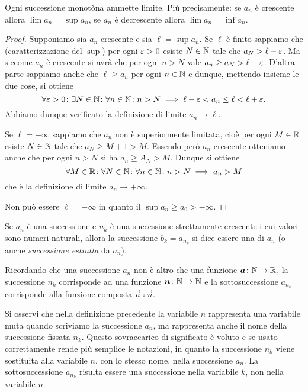 \begin{theorem}
\mymark{***}
Ogni successione monotòna ammette limite.
Più precisamente: se $a_n$ è crescente allora $\lim a_n = \sup a_n$,
se $a_n$ è decrescente allora $\lim a_n = \inf a_n$.
\end{theorem}
%
\begin{proof}
\mymark{***}
Supponiamo sia $a_n$ crescente e sia $\ell = \sup a_n$.
Se $\ell$ è finito sappiamo che (caratterizzazione del $\sup$)
per ogni $\varepsilon>0$ esiste $N\in \mathbb N$ tale che $a_N> \ell -\varepsilon$.
Ma siccome $a_n$ è crescente si avrà che per ogni $n>N$ vale
$a_n \ge a_N > \ell-\varepsilon$.
D'altra parte sappiamo anche che $\ell\ge a_n$ per ogni $n\in \mathbb N$
e dunque, mettendo insieme le due cose, si ottiene
\[
  \forall \varepsilon>0 \colon \exists N\in \mathbb N \colon \forall n\in \mathbb N\colon
   n>N \implies \ell-\varepsilon < a_n \le \ell < \ell + \varepsilon.
\]
Abbiamo dunque verificato la definizione di limite $a_n \to \ell$.

Se  $\ell=+\infty$ sappiamo che $a_n$ non è superiormente limitata, cioè per ogni $M\in \mathbb R$ esiste $N\in \mathbb N$ tale che $a_N \ge M+1 > M$.
Essendo però $a_n$ crescente otteniamo anche che per ogni $n>N$ si
 ha $a_n \ge A_N > M$. Dunque si ottiene
 \[
 \forall M\in \mathbb R\colon\forall N\in \mathbb N\colon \forall n \in \mathbb N\colon
  n>N \implies a_n > M
 \]
 che è la definizione di limite $a_n \to +\infty$.

Non può essere $\ell = -\infty$ in quanto il $\sup a_n \ge a_0 > -\infty$.
\end{proof}

\begin{definition}[sottosuccessione]
\mymark{*}
Se $a_n$ è una successione e $n_k$ è una successione strettamente crescente i cui valori sono numeri naturali, allora la successione
$b_k = a_{n_k}$ si dice essere una  di $a_n$
(o anche \emph{successione estratta} da $a_n$).
\end{definition}

Ricordando che una successione $a_n$ non è altro che una funzione
$\boldsymbol a\colon \mathbb N \to \mathbb R$, la successione $n_k$ corrisponde ad una funzione
$\boldsymbol n\colon \mathbb N \to \mathbb N$ e la sottosuccessione $a_{n_k}$ corrisponde alla
funzione composta $\vec a \circ \vec n$.

Si osservi che nella definizione precedente la variabile $n$ rappresenta
una variabile muta quando scriviamo la successione $a_n$, ma
rappresenta anche il nome della successione fissata $n_k$.
Questo sovraccarico
di significato è voluto e se usato correttamente rende più semplice
le notazioni, in quanto la successione $n_k$ viene sostituita alla
variabile $n$, con lo stesso nome, nella successione $a_n$.
La sottosuccessione $a_{n_k}$ risulta essere una successione nella variabile $k$, non nella variabile $n$.

